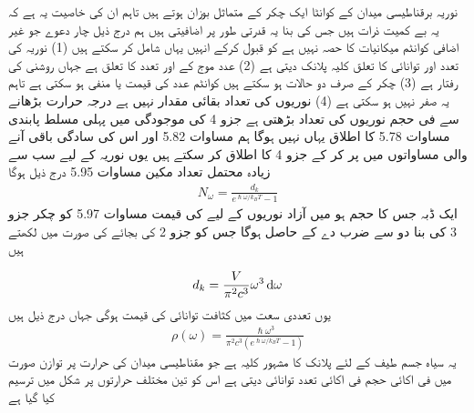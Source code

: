 
نوریہ برقناطیسی میدان کے کوانٹا ایک چکر کے متماثل بوزان ہوتے ہیں تاہم ان کی خاصیت یہ ہے کہ یہ بے کمیت ذرات ہیں جس کی بنا یہ قدرتی طور پر اضافیتی ہیں ہم درج ذیل چار دعوے جو غیر اضافی کوانٹم میکانیات کا حصہ نہیں ہے کو قبول کرکے انہیں یہاں شامل کر سکتے ہیں  (1) نوریہ کی تعدد اور توانائی کا تعلق کلیہ پلانک  دیتی ہے  (2) عدد موج کے اور تعدد کا تعلق  ہے جہاں  روشنی کی رفتار ہے  (3) چکر کے صرف دو حالات ہو سکتے ہیں کوانٹم عدد  کی قیمت  یا منفی  ہو سکتی ہے تاہم یہ صفر نہیں ہو سکتی ہے  (4) نوریوں کی تعداد بقائی مقدار نہیں ہے درجہ حرارت بڑھانے سے فی حجم نوریوں کی تعداد بڑھتی ہے  جزو 4 کی موجودگی میں پہلی مسلط پابندی مساوات 5.78 کا اطلاق یہاں نہیں ہوگا ہم مساوات 5.82 اور اس کی سادگی باقی آنے والی مساواتوں میں  پر کر کے جزو 4 کا اطلاق کر سکتے ہیں یوں نوریہ کے لیے سب سے زیادہ محتمل تعداد مکین مساوات 5.95 درج ذیل ہوگا 
\begin{align}
N_{\omega} = \frac{d_k}{e^{\hslash \omega / k_B T} - 1}
\end{align}
ایک ڈبہ جس کا حجم  ہو میں آزاد نوریوں کے لیے  کی قیمت مساوات 5.97 کو چکر جزو 3 کی بنا دو سے ضرب دے کے حاصل ہوگا جس کو  جزو 2 کی بجائے  کی صورت میں لکھتے ہیں 

\begin{align} 
d_k = \frac{V}{\pi^2 c^3} \omega^3 \dif  \omega
\end{align}
یوں تعددی سعت   میں کثافت توانائی  کی قیمت  ہوگی جہاں  درج ذیل ہیں 
\begin{align}
\rho (\omega) = \frac{\hslash \omega^3}{\pi^2 c^3 (e^{\hslash \omega / k_B T} - 1)}
\end{align}
یہ سیاہ جسم طیف کے لئے پلانک کا مشہور کلیہ ہے جو مقناطیسی میدان کی حرارت  پر توازن صورت میں فی اکائی حجم فی اکائی تعدد توانائی دیتی ہے اس کو تین مختلف حرارتوں پر شکل  میں ترسیم کیا گیا ہے 

